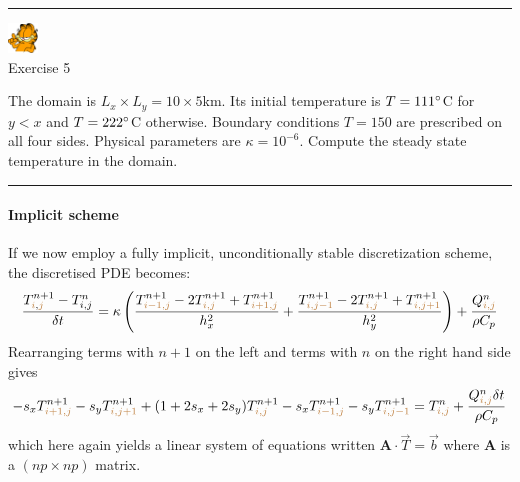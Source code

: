 \begin{center}
\begin{minipage}[t]{0.77\textwidth}
\par\noindent\rule{\textwidth}{0.4pt}
\begin{center}
\includegraphics[width=0.8cm]{images/garftr} \\
{\color{orange}Exercise 5}
\end{center}

The domain is $L_x \times L_y = 10\times 5$km. 
Its initial temperature is $T=111\degree$C for $y<x$
and $T=222\degree$C otherwise.
Boundary conditions $T=150$ are prescribed on all four sides.
Physical parameters are $\kappa=10^{-6}$.
Compute the steady state temperature in the domain.
\par\noindent\rule{\textwidth}{0.4pt}
\end{minipage}
\end{center}











\paragraph{Implicit scheme} 
If we now employ a fully implicit, unconditionally stable discretization scheme, the discretised 
PDE becomes:
\[
\frac{T_{{\color{brown}i},{\color{brown}j}}^{n+1}-T_{i,j}^n}{\delta t}
= \kappa
\left(
\frac{ T_{{\color{brown}i-1,j}}^{n+1}-2T_{{\color{brown}i,j}}^{n+1}+T_{{\color{brown}i+1,j}}^{n+1} }{h_x^2} + 
\frac{ T_{{\color{brown}i,j-1}}^{n+1}-2T_{{\color{brown}i,j}}^{n+1}+T_{{\color{brown}i,j+1}}^{n+1} }{h_y^2}
\right)
+\frac{Q_{{\color{brown}i,j}}^n}{\rho C_p}
\]
Rearranging terms with $n+1$ on the left and terms with $n$ on the right hand side gives
\[
-s_x T_{{\color{brown}i+1,j}}^{n+1}
-s_y T_{{\color{brown}i,j+1}}^{n+1} 
+(1+2s_x+2s_y)T_{{\color{brown}i,j}}^{n+1} 
-s_x T_{{\color{brown}i-1,j}}^{n+1} 
-s_y T_{{\color{brown}i,j-1}}^{n+1} 
=
T_{{\color{brown}i,j}}^n
+\frac{Q_{{\color{brown}i,j}}^n \delta t}{\rho C_p}
\]
which here again yields a linear system of equations written ${\bm A}\cdot {\vec T} = {\vec b}$
where ${\bm A}$ is a $(np \times np)$ matrix.



